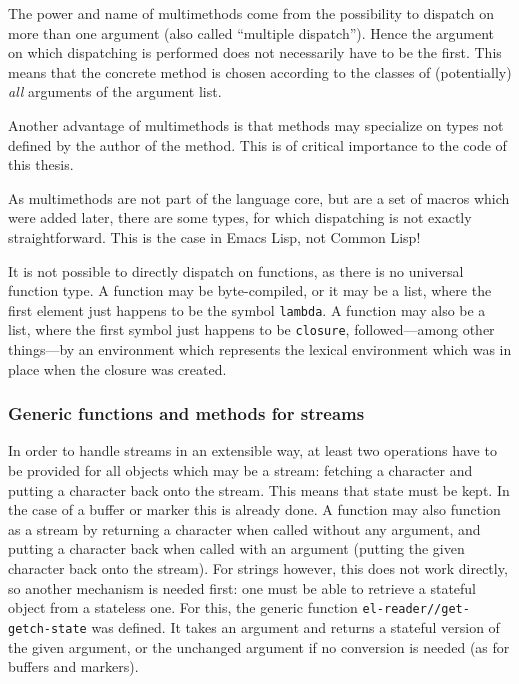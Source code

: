 \documentclass[a4paper,10pt,twoside]{report}
\newcommand{\el}{Emacs Lisp}
\newcommand{\cl}{Common Lisp}
\newcommand{\sym}[1]{\texttt{#1}}
\newcommand{\fun}[1]{\texttt{#1}}
\begin{document}
The power and name of multimethods come from the possibility to dispatch on more
than one argument (also called ``multiple dispatch'').  Hence the argument on
which dispatching is performed does not necessarily have to be the first.  This
means that the concrete method is chosen according to the classes of
(potentially) \emph{all} arguments of the argument list.

Another advantage of multimethods is that methods may specialize on types not
defined by the author of the method.  This is of critical importance to the code
of this thesis.

As multimethods are not part of the language core, but are a set of macros which
were added later, there are some types, for which dispatching is not exactly
straightforward.  This is the case in \el{}, not \cl{}!

It is not possible to directly dispatch on functions, as there is no universal
function type.  A function may be byte-compiled, or it may be a list, where the
first element just happens to be the symbol \sym{lambda}.  A function may also
be a list, where the first symbol just happens to be \sym{closure},
followed---among other things---by an environment which represents the lexical
environment which was in place when the closure was created.

\subsubsection{Generic functions and methods for streams}
\label{subsubsec:multimethods-streams}

In order to handle streams in an extensible way, at least two operations have to
be provided for all objects which may be a stream: fetching a character and
putting a character back onto the stream.  This means that state must be kept.
In the case of a buffer or marker this is already done.  A function may also
function as a stream by returning a character when called without any argument,
and putting a character back when called with an argument (putting the given
character back onto the stream).  For strings however, this does not work
directly, so another mechanism is needed first: one must be able to retrieve a
stateful object from a stateless one.  For this, the generic function
\fun{el-reader//get-getch-state} was defined.  It takes an argument and returns
a stateful version of the given argument, or the unchanged argument if no
conversion is needed (as for buffers and markers).
\end{document}
